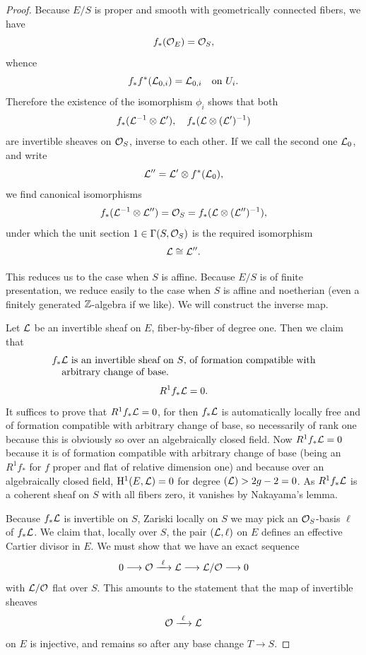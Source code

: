 \begin{proof}
Because $E/S$ is proper and smooth with geometrically connected fibers, we have
\[
f_*(\mathcal{O}_E) = \mathcal{O}_S,
\]
whence
\[
f_* f^*(\mathcal{L}_{0,i}) = \mathcal{L}_{0,i} \quad \text{on } U_i.
\]
Therefore the existence of the isomorphism $\phi_i$ shows that both
\[
f_*(\mathcal{L}^{-1} \otimes \mathcal{L}'), \quad f_*(\mathcal{L} \otimes (\mathcal{L}')^{-1})
\]
are invertible sheaves on $\mathcal{O}_S$, inverse to each other. If we call the second one $\mathcal{L}_0$, and write
\[
\mathcal{L}'' = \mathcal{L}' \otimes f^*(\mathcal{L}_0),
\]
we find canonical isomorphisms
\[
f_*(\mathcal{L}^{-1} \otimes \mathcal{L}'') = \mathcal{O}_S = f_*(\mathcal{L} \otimes (\mathcal{L}'')^{-1}),
\]
under which the unit section $1 \in \Gamma(S, \mathcal{O}_S)$ is the required isomorphism
\[
\mathcal{L} \cong \mathcal{L}''.
\]

This reduces us to the case when $S$ is affine. Because $E/S$ is of finite presentation, we reduce easily to the case when $S$ is affine and noetherian (even a finitely generated $\mathbb{Z}$-algebra if we like). We will construct the inverse map.

Let $\mathcal{L}$ be an invertible sheaf on $E$, fiber-by-fiber of degree one. Then we claim that
\[
\begin{array}[t]{@{}l@{}}
f_* \cL \text{ is an invertible sheaf on } S \text{, of formation compatible with} \\
\quad \text{arbitrary change of base.}
\end{array}
\]
\[
R^1 f_* \mathcal{L} = 0.
\]
It suffices to prove that $R^1 f_* \mathcal{L} = 0$, for then \cite[Mum 4, p.~53]{Mum4} $f_* \mathcal{L}$ is automatically locally free and of formation compatible with arbitrary change of base, so necessarily of rank one because this is obviously so over an algebraically closed field. Now $R^1 f_* \mathcal{L} = 0$ because it is of formation compatible with arbitrary change of base (being an $R^1 f_*$ for $f$ proper and flat of relative dimension one) and because over an algebraically closed field, $\mathrm{H}^1(E, \mathcal{L}) = 0$ for degree $(\mathcal{L}) > 2g - 2 = 0$. As $R^1 f_* \mathcal{L}$ is a coherent sheaf on $S$ with all fibers zero, it vanishes by Nakayama's lemma.

Because $f_* \mathcal{L}$ is invertible on $S$, Zariski locally on $S$ we may pick an $\mathcal{O}_S$-basis $\ell$ of $f_* \mathcal{L}$. We claim that, locally over $S$, the pair $(\mathcal{L}, \ell)$ on $E$ defines an effective Cartier divisor in $E$. We must show that we have an exact sequence
\[
0 \longrightarrow \mathcal{O} \xrightarrow{\ \ell\ } \mathcal{L} \longrightarrow \mathcal{L}/\mathcal{O} \longrightarrow 0
\]
with $\mathcal{L}/\mathcal{O}$ flat over $S$. This amounts to the statement that the map of invertible sheaves
\[
\mathcal{O} \xrightarrow{\ \ell\ } \mathcal{L}
\]
on $E$ is injective, and remains so after any base change $T \to S$.


\end{proof}
